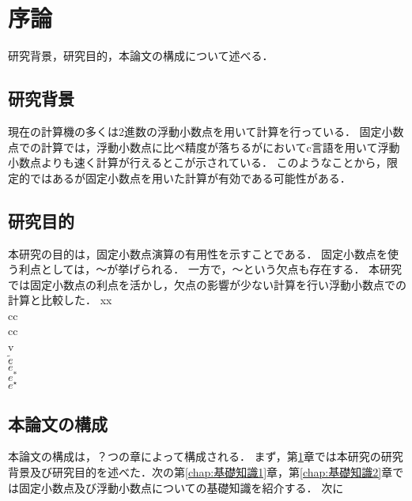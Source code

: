 \chapter{序論}
\label{chap:序論}
研究背景，研究目的，本論文の構成について述べる．
\begin{comment}
    目標規定：
    この修士論文は，固定小数点演算が浮動小数点演算に比べ精度の高い計算を行える場合があることを示すために書く．
\end{comment}
\section{研究背景}
現在の計算機の多くは2進数の浮動小数点を用いて計算を行っている．
固定小数点での計算では，浮動小数点に比べ精度が落ちるが\cite{IJERTV12IS010134}においてc言語を用いて浮動小数点よりも速く計算が行えるとこが示されている．
このようなことから，限定的ではあるが固定小数点を用いた計算が有効である可能性がある．

\section{研究目的}
本研究の目的は，固定小数点演算の有用性を示すことである．
固定小数点を使う利点としては，〜が挙げられる．
一方で，〜という欠点も存在する．
本研究では固定小数点の利点を活かし，欠点の影響が少ない計算を行い浮動小数点での計算と比較した．
xx\\
cc \\
cc\\
v\\
$\tilde{e} $\\
$\bar{e}$\\
$e^{\ast}$\\
$e^{\star}$\\
\section{本論文の構成}
本論文の構成は，？つの章によって構成される．
まず，第\ref{chap:序論}章では本研究の研究背景及び研究目的を述べた．次の第\ref{chap:基礎知識1}章，第\ref{chap:基礎知識2}章では固定小数点及び浮動小数点についての基礎知識を紹介する．
次に\cite{hopkins2020stochastic}
